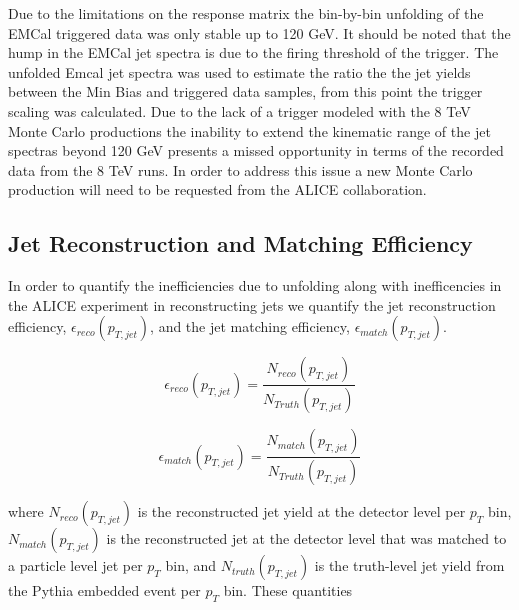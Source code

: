 \noindent
Due to the limitations on the response matrix the bin-by-bin unfolding of the EMCal triggered data was only stable up to 120 GeV.  It should be noted that the hump in the EMCal jet spectra is due to the firing threshold of the trigger.  The unfolded Emcal jet spectra was used to estimate the ratio the the jet yields between the Min Bias and triggered data samples, from this point the trigger scaling was calculated.  Due to the lack of a trigger modeled with the 8 TeV Monte Carlo productions the inability to extend the kinematic range of the jet spectras beyond 120 GeV presents a missed opportunity in terms of the recorded data from the 8 TeV runs.  In order to address this issue a new Monte Carlo production will need to be requested from the ALICE collaboration.

\subsection{Jet Reconstruction and Matching Efficiency}
In order to quantify the inefficiencies due to unfolding along with inefficencies in the ALICE experiment in reconstructing jets we quantify the jet reconstruction efficiency, $\epsilon_{reco} (p_{T, jet})$, and the jet matching efficiency, $\epsilon_{match} (p_{T, jet})$.

\begin{equation}
 \epsilon_{reco} (p_{T, jet}) = \frac{N_{reco}(p_{T, jet}) }{N_{Truth} (p_{T, jet})}
\label{eq:jetrecoeff}
\end{equation}

\begin{equation}
 \epsilon_{match} (p_{T, jet}) = \frac{N_{match}(p_{T, jet}) }{N_{Truth}(p_{T, jet})}
\label{eq:jetmatchoeff}
\end{equation}

\noindent 
where $N_{reco} (p_{T, jet})$ is the reconstructed jet yield at the detector level per $p_{T}$ bin, $N_{match}(p_{T, jet})$ is the reconstructed jet at the detector level that was matched to a particle level jet per $p_{T}$ bin, and $N_{truth} (p_{T, jet})$ is the truth-level jet yield from the Pythia embedded event per $p_{T}$ bin.  These quantities 





